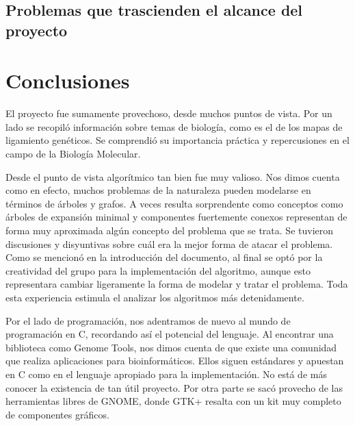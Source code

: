\documentclass{article}
\begin{document}
	
	\subsection{Problemas que trascienden el alcance del proyecto}
	
	
	\section{Conclusiones}
	
	El proyecto fue sumamente provechoso, desde muchos puntos de vista. Por un lado se recopiló información sobre temas de biología, como es el de los mapas de ligamiento genéticos. Se comprendió su importancia práctica y repercusiones en el campo de la Biología Molecular.
	
	Desde el punto de vista algorítmico tan bien fue muy valioso. Nos dimos cuenta como en efecto, muchos problemas de la naturaleza pueden modelarse en términos de árboles y grafos. A veces resulta sorprendente como conceptos como árboles de expansión minimal y componentes fuertemente conexos representan de forma muy aproximada algún concepto del problema que se trata. Se tuvieron discusiones y disyuntivas sobre cuál era la mejor forma de atacar el problema. Como se mencionó en la introducción del documento, al final se optó por la creatividad del grupo para la implementación del algoritmo, aunque esto representara cambiar ligeramente la forma de modelar y tratar el problema. Toda esta experiencia estimula el analizar los algoritmos más detenidamente.
	
	Por el lado de programación, nos adentramos de nuevo al mundo de programación en C, recordando así el potencial del lenguaje. Al encontrar una biblioteca como Genome Tools, nos dimos cuenta de que existe una comunidad que realiza aplicaciones para bioinformáticos. Ellos siguen estándares y apuestan en C como en el lenguaje apropiado para la implementación. No está de más conocer la existencia de tan útil proyecto. Por otra parte se sacó provecho de las herramientas libres de GNOME, donde GTK+ resalta con un kit muy completo de componentes gráficos.
	
	
	
	
\end{document}
